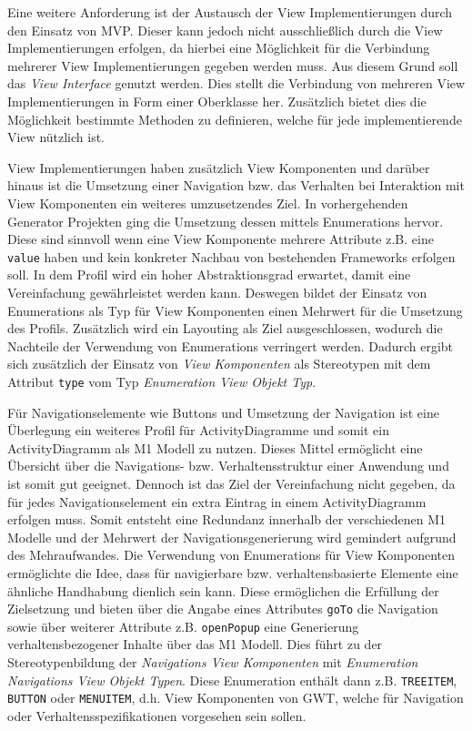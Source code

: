 Eine weitere Anforderung ist der Austausch der View Implementierungen durch den
Einsatz von MVP. Dieser kann jedoch nicht ausschließlich durch die View
Implementierungen erfolgen, da hierbei eine Möglichkeit für die
Verbindung mehrerer View Implementierungen gegeben werden muss. Aus diesem Grund
soll das \textit{View Interface} genutzt werden. Dies stellt die Verbindung von mehreren
View Implementierungen in Form einer Oberklasse her. Zusätzlich bietet dies die
Möglichkeit bestimmte Methoden zu definieren, welche für jede implementierende
View nützlich ist. 

View Implementierungen haben zusätzlich View Komponenten und darüber hinaus ist
die Umsetzung einer Navigation bzw. das Verhalten bei Interaktion mit
View Komponenten ein weiteres umzusetzendes Ziel. In vorhergehenden Generator
Projekten ging die Umsetzung dessen mittels Enumerations hervor. Diese sind
sinnvoll wenn eine View Komponente mehrere Attribute z.B. eine \texttt{value}
haben und kein konkreter Nachbau von bestehenden Frameworks erfolgen soll. In dem Profil
wird ein hoher Abstraktionsgrad erwartet, damit eine Vereinfachung gewährleistet
werden kann. Deswegen bildet der Einsatz von Enumerations als Typ für
View Komponenten einen Mehrwert für die Umsetzung des Profils. Zusätzlich wird ein Layouting als
Ziel ausgeschlossen, wodurch die Nachteile der Verwendung von Enumerations
verringert werden. Dadurch ergibt sich zusätzlich der Einsatz von \textit{View
Komponenten} als Stereotypen mit dem Attribut \texttt{type} vom Typ
\textit{Enumeration View Objekt Typ}.

Für Navigationselemente wie Buttons und Umsetzung der Navigation ist eine
Überlegung ein weiteres Profil für ActivityDiagramme und somit ein
ActivityDiagramm als M1 Modell zu nutzen. Dieses Mittel ermöglicht eine
Übersicht über die Navigations- bzw. Verhaltensstruktur einer Anwendung
und ist somit gut geeignet. Dennoch ist das Ziel der Vereinfachung nicht
gegeben, da für jedes Navigationselement ein extra Eintrag in einem
ActivityDiagramm erfolgen muss. Somit entsteht eine Redundanz innerhalb der
verschiedenen M1 Modelle und der Mehrwert der Navigationsgenerierung wird
gemindert aufgrund des Mehraufwandes. Die Verwendung von Enumerations für View
Komponenten ermöglichte die Idee, dass für navigierbare bzw. verhaltensbasierte
Elemente eine ähnliche Handhabung dienlich sein kann. Diese ermöglichen die Erfüllung der
Zielsetzung und bieten über die Angabe eines Attributes \texttt{goTo} die
Navigation sowie über weiterer Attribute z.B. \texttt{openPopup} eine
Generierung verhaltensbezogener Inhalte über das M1 Modell. Dies führt zu der
Stereotypenbildung der \textit{Navigations View Komponenten} mit
\textit{Enumeration Navigations View Objekt Typen}. Diese Enumeration enthält
dann z.B. \texttt{TREEITEM}, \texttt{BUTTON} oder \texttt{MENUITEM}, d.h. View
Komponenten von GWT, welche für Navigation oder Verhaltensspezifikationen vorgesehen sein sollen.

